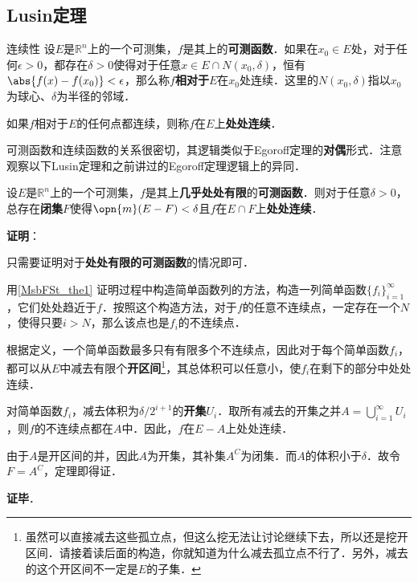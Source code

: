 \subsection{Lusin定理}

\begin{definition}{连续性}
设$E$是$\mathbb{R}^n$上的一个可测集，$f$是其上的\textbf{可测函数}．如果在$x_0\in E$处，对于任何$\epsilon>0$，都存在$\delta>0$使得对于任意$x\in E\cap N(x_0, \delta)$，恒有$\abs{f(x)-f(x_0)}<\epsilon$，那么称$f$\textbf{相对于}$E$在$x_0$处连续．这里的$N(x_0, \delta)$指以$x_0$为球心、$\delta$为半径的邻域．

如果$f$相对于$E$的任何点都连续，则称$f$在$E$上\textbf{处处连续}．
\end{definition}

可测函数和连续函数的关系很密切，其逻辑类似于Egoroff定理的\textbf{对偶}形式．注意观察以下Lusin定理和之前讲过的Egoroff定理逻辑上的异同．

\begin{theorem}{}\label{MsbFSt_the2}

设$E$是$\mathbb{R}^n$上的一个可测集，$f$是其上\textbf{几乎处处有限}的\textbf{可测函数}．则对于任意$\delta>0$，总存在\textbf{闭集}$F$使得$\opn{m}(E-F)<\delta$且$f$在$E\cap F$上\textbf{处处连续}．

\end{theorem}

\textbf{证明}：

只需要证明对于\textbf{处处有限的可测函数}的情况即可．

用\autoref{MsbFSt_the1}  证明过程中构造简单函数列的方法，构造一列简单函数$\{f_i\}_{i=1}^\infty$，它们处处趋近于$f$．按照这个构造方法，对于$f$的任意不连续点，一定存在一个$N$，使得只要$i>N$，那么该点也是$f_i$的不连续点．

根据定义，一个简单函数最多只有有限多个不连续点，因此对于每个简单函数$f_i$，都可以从$E$中减去有限个\textbf{开区间}\footnote{虽然可以直接减去这些孤立点，但这么挖无法让讨论继续下去，所以还是挖开区间．请接着读后面的构造，你就知道为什么减去孤立点不行了．另外，减去的这个开区间不一定是$E$的子集．}，其总体积可以任意小，使$f_i$在剩下的部分中处处连续．

对简单函数$f_i$，减去体积为$\delta/2^{i+1}$的\textbf{开集}$U_i$．取所有减去的开集之并$A=\bigcup_{i=1}^\infty U_i$，则$f$的不连续点都在$A$中．因此，$f$在$E-A$上处处连续．

由于$A$是开区间的并，因此$A$为开集，其补集$A^C$为闭集．而$A$的体积小于$\delta$．故令$F=A^C$，定理即得证．

\textbf{证毕}．

